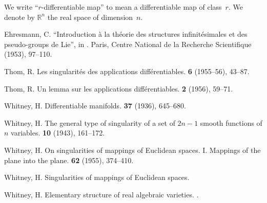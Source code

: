 \documentclass{article}
\theoremstyle{plain}
\theoremstyle{definition}
\newcommand{\RR}{\mathbb{R}}
\begin{document}
We write ``$r$-differentiable map'' to mean a differentiable map of class~$r$.
We denote by $\RR^n$ the real space of dimension~$n$.



\nocite{*}

\begin{thebibliography}{1}

  {\sc Ehresmann, C.}
  \newblock ``Introduction \`{a} la th\'{e}orie des structures infinit\'{e}simales et des pseudo-groups de Lie'', in
  .
  \newblock Paris, Centre National de la Recherche Scientifique (1953), 97--110.

  {\sc Thom, R.}
  \newblock Les singularit\'{e}s des applications diff\'{e}rentiables.
   \textbf{6} (1955--56), 43--87.

  {\sc Thom, R.}
  \newblock Un lemma sur les applications diff\'{e}rentiables.
   \textbf{2} (1956), 59--71.

  {\sc Whitney, H.}
  \newblock Differentiable manifolds.
   \textbf{37} (1936), 645--680.

  {\sc Whitney, H.}
  \newblock The general type of singularity of a set of $2n-1$ smooth functions of $n$ variables.
   \textbf{10} (1943), 161--172.

  {\sc Whitney, H.}
  \newblock On singularities of mappings of Euclidean spaces. I. Mappings of the plane into the plane.
   \textbf{62} (1955), 374--410.

  {\sc Whitney, H.}
  \newblock Singularities of mappings of Euclidean spaces.

  {\sc Whitney, H.}
  \newblock Elementary structure of real algebraic varieties.
  .

\end{thebibliography}
\end{document}
